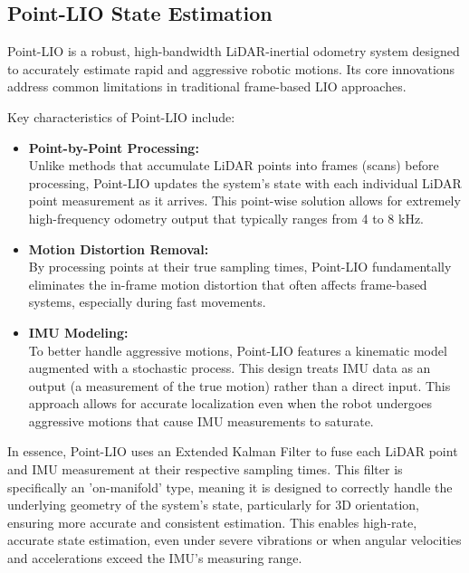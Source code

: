        \subsection{Point-LIO State Estimation}
            \ac{Point-LIO} \cite{point_lio_paper} is a robust, high-bandwidth \ac{LiDAR}-inertial odometry system designed to accurately estimate rapid and aggressive robotic motions. 
            Its core innovations address common limitations in traditional frame-based LIO approaches.

            Key characteristics of \ac{Point-LIO} include:
            \begin{itemize}
                \item \textbf{Point-by-Point Processing: } \\
                    Unlike methods that accumulate \ac{LiDAR} points into frames (scans) before processing, \ac{Point-LIO} updates the system's state with each individual \ac{LiDAR} point measurement as it arrives. 
                    This point-wise solution allows for extremely high-frequency odometry output that typically ranges from 4 to 8 kHz.
                \item \textbf{Motion Distortion Removal: } \\ 
                    By processing points at their true sampling times, \ac{Point-LIO} fundamentally eliminates the in-frame motion distortion that often affects frame-based systems, especially during fast movements.
                \item \textbf{IMU Modeling:} \\
                    To better handle aggressive motions, \ac{Point-LIO} features a kinematic model augmented with a stochastic process. 
                    This design treats \ac{IMU} data as an output (a measurement of the true motion) rather than a direct input.
                    This approach allows for accurate localization even when the robot undergoes aggressive motions that cause \ac{IMU} measurements to saturate.
            \end{itemize}
            In essence, \ac{Point-LIO} uses an Extended Kalman Filter to fuse each \ac{LiDAR} point and \ac{IMU} measurement at their respective sampling times. 
            This filter is specifically an 'on-manifold' type, meaning it is designed to correctly handle the underlying geometry of the system's state, particularly for 3D orientation, ensuring more accurate and consistent estimation. 
            This enables high-rate, accurate state estimation, even under severe vibrations or when angular velocities and accelerations exceed the \ac{IMU}'s measuring range.

